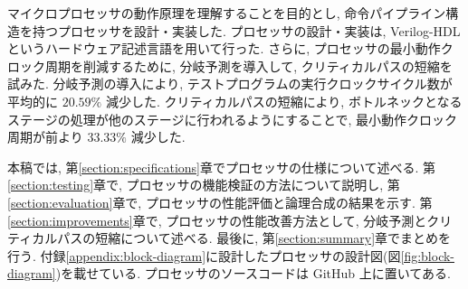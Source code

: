 \documentclass[../main.tex]{subfiles}
\begin{document}
  マイクロプロセッサの動作原理を理解することを目的とし, 
  命令パイプライン構造を持つプロセッサを設計・実装した.
  プロセッサの設計・実装は, Verilog-HDL というハードウェア記述言語を用いて行った.
  さらに, プロセッサの最小動作クロック周期を削減するために, 
  分岐予測を導入して, クリティカルパスの短縮を試みた.
  分岐予測の導入により, テストプログラムの実行クロックサイクル数が平均的に $20.59\%$ 減少した.
  クリティカルパスの短縮により, 
  ボトルネックとなるステージの処理が他のステージに行われるようにすることで, 
  最小動作クロック周期が前より $33.33\%$ 減少した.

  本稿では, 第\ref{section:specifications}章でプロセッサの仕様について述べる.
  第\ref{section:testing}章で, プロセッサの機能検証の方法について説明し, 
  第\ref{section:evaluation}章で, プロセッサの性能評価と論理合成の結果を示す.
  第\ref{section:improvements}章で, プロセッサの性能改善方法として, 分岐予測とクリティカルパスの短縮について述べる.
  最後に, 第\ref{section:summary}章でまとめを行う.
  付録\ref{appendix:block-diagram}に設計したプロセッサの設計図(図\ref{fig:block-diagram})を載せている.
  プロセッサのソースコードは GitHub \footnotemark 上に置いてある.
\end{document}
